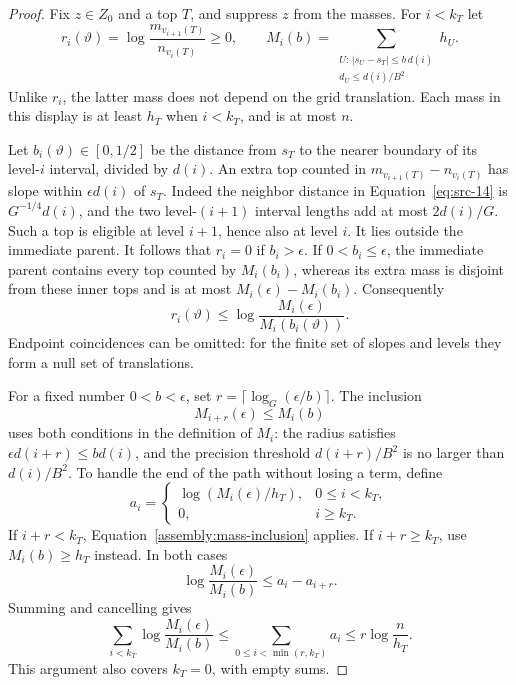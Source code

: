\begin{proof}
Fix \(z\in Z_0\) and a top \(T\), and suppress \(z\) from the
masses.  For \(i<k_T\) let
\[
 r_i(\vartheta)
       =\log\frac{m_{v_{i+1}(T)}}{n_{v_i(T)}}\ge0,
 \qquad
 M_i(b)=\sum_{\substack{U:\,|s_U-s_T|\le b\,d(i)\\
                              d_U\le d(i)/B^2}}h_U.
\]
Unlike \(r_i\), the latter mass does not depend on the grid
translation.  Each mass in this display is at least \(h_T\) when
\(i<k_T\), and is at most \(n\).

Let \(b_i(\vartheta)\in[0,1/2]\) be the distance from \(s_T\) to
the nearer boundary of its level-\(i\) interval, divided by \(d(i)\).
An extra top counted in
\(m_{v_{i+1}(T)}-n_{v_i(T)}\) has slope within
\(\epsilon d(i)\) of \(s_T\).  Indeed the neighbor distance in
Equation~\eqref{eq:src-14} is \(G^{-1/4}d(i)\), and the two
level-\((i+1)\) interval lengths add at most \(2d(i)/G\).
Such a top is eligible at level \(i+1\), hence also at level \(i\).
It lies outside the immediate parent.  It follows that \(r_i=0\)
if \(b_i>\epsilon\).  If \(0<b_i\le\epsilon\), the immediate
parent contains every top counted by \(M_i(b_i)\), whereas its extra
mass is disjoint from these inner tops and is at most
\(M_i(\epsilon)-M_i(b_i)\).  Consequently
\begin{equation}\label{assembly:one-boundary-loss}
 r_i(\vartheta)
       \le\log\frac{M_i(\epsilon)}{M_i(b_i(\vartheta))}.
\end{equation}
Endpoint coincidences can be omitted: for the finite set of slopes
and levels they form a null set of translations.

For a fixed number \(0<b<\epsilon\), set
\(r=\lceil\log_G(\epsilon/b)\rceil\).  The inclusion
\begin{equation}\label{assembly:mass-inclusion}
 M_{i+r}(\epsilon)\le M_i(b)
\end{equation}
uses both conditions in the definition of \(M_i\): the radius
satisfies \(\epsilon d(i+r)\le b d(i)\), and the precision threshold
\(d(i+r)/B^2\) is no larger than \(d(i)/B^2\).
To handle the end of the path without losing a term, define
\[
 a_i=\begin{cases}
       \log(M_i(\epsilon)/h_T),&0\le i<k_T,\\
       0,&i\ge k_T.
      \end{cases}
\]
If \(i+r<k_T\), Equation~\eqref{assembly:mass-inclusion} applies.
If \(i+r\ge k_T\), use \(M_i(b)\ge h_T\) instead.  In both cases
\[
 \log\frac{M_i(\epsilon)}{M_i(b)}\le a_i-a_{i+r}.
\]
Summing and cancelling gives
\begin{equation}\label{assembly:boundary-telescope}
 \sum_{i<k_T}\log\frac{M_i(\epsilon)}{M_i(b)}
 \le\sum_{0\le i<\min(r,k_T)}a_i
 \le r\log\frac n{h_T}.
\end{equation}
This argument also covers \(k_T=0\), with empty sums.


\end{proof}
